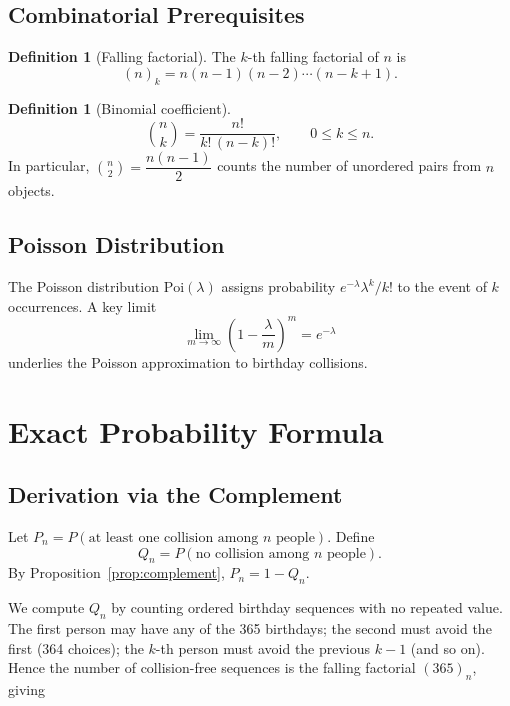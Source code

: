 \documentclass[12pt]{report}
\theoremstyle{definition}
\newtheorem{definition}[theorem]{Definition}
\begin{document}
\section{Combinatorial Prerequisites}

\begin{definition}[Falling factorial]
  The $k$-th falling factorial of $n$ is
  \[
    (n)_k = n(n-1)(n-2)\cdots(n-k+1).
  \]
\end{definition}

\begin{definition}[Binomial coefficient]
  \[
    \binom{n}{k} = \frac{n!}{k!\,(n-k)!}, \qquad 0 \le k \le n.
  \]
  In particular, $\binom{n}{2} = \dfrac{n(n-1)}{2}$ counts the number of unordered
  pairs from $n$ objects.
\end{definition}

\section{Poisson Distribution}

The Poisson distribution $\mathrm{Poi}(\lambda)$ assigns probability
$e^{-\lambda}\lambda^k / k!$ to the event of $k$ occurrences.  A key limit
\[
  \lim_{m\to\infty}\left(1 - \frac{\lambda}{m}\right)^m = e^{-\lambda}
\]
underlies the Poisson approximation to birthday collisions.

\chapter{Exact Probability Formula}

\section{Derivation via the Complement}

Let $P_n = P(\text{at least one collision among } n \text{ people})$.  Define
\[
  Q_n = P(\text{no collision among } n \text{ people}).
\]
By Proposition~\ref{prop:complement}, $P_n = 1 - Q_n$.

We compute $Q_n$ by counting ordered birthday sequences with no repeated value.
The first person may have any of the 365 birthdays; the second must avoid the first
(364 choices); the $k$-th person must avoid the previous $k-1$ (and so on).  Hence
the number of collision-free sequences is the falling factorial $(365)_n$, giving
\end{document}
